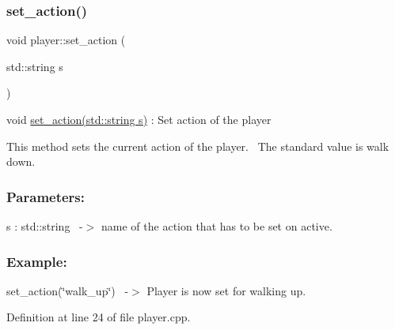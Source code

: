 \subsubsection{\texorpdfstring{set\+\_\+action()}{set\_action()}}
{\footnotesize\ttfamily void player\+::set\+\_\+action (\begin{DoxyParamCaption}\item[{std\+::string}]{s }\end{DoxyParamCaption})}



void \hyperlink{classplayer_aa673c84d7b56badc58d7c467325cbf88}{set\+\_\+action(std\+::string s)} \+: Set action of the player 

This method sets the current action of the player.~\newline
The standard value is walk down.~\newline


\subsubsection*{Parameters\+: }

s \+: std\+::string~\newline
-\/$>$ name of the action that has to be set on active.

\subsubsection*{Example\+: }

set\+\_\+action(\char`\"{}walk\+\_\+up\char`\"{})~\newline
-\/$>$ Player is now set for walking up.~\newline


Definition at line 24 of file player.\+cpp.


